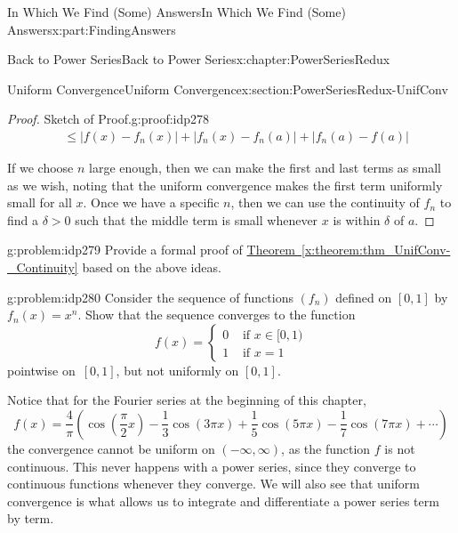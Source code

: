 \documentclass[oneside,10pt,]{book}
\newcommand{\xreffont}{\relax}
\numberwithin{equation}{section}
\newcommand{\amp}{&}
\begin{document}
\begin{partptx}{In Which We Find (Some) Answers}{}{In Which We Find (Some) Answers}{}{}{x:part:FindingAnswers}
\begin{chapterptx}{Back to Power Series}{}{Back to Power Series}{}{}{x:chapter:PowerSeriesRedux}
\begin{sectionptx}{Uniform Convergence}{}{Uniform Convergence}{}{}{x:section:PowerSeriesRedux-UnifConv}
\begin{proof}{Sketch of Proof.}{g:proof:idp278}
\begin{align*}
\amp \leq \left|f(x)-f_n(x)\right|+\left|f_n(x)-f_n(a)\right|+\left|f_n(a)-f(a)\right|
\end{align*}
%
\par
If we choose \(n\) large enough, then we can make the first and last terms as small as we wish, noting that the uniform convergence makes the first term uniformly small for all \(x\). Once we have a specific \(n\), then we can use the continuity of \(f_n\) to find a \(\delta>0\) such that the middle term is small whenever \(x\) is within \(\delta\) of \(a\).%
\end{proof}
\begin{problem}{}{g:problem:idp279}%
 Provide a formal proof of \hyperref[x:theorem:thm_UnifConv-_Continuity]{Theorem~{\xreffont\ref{x:theorem:thm_UnifConv-_Continuity}}} based on the above ideas.%
\end{problem}
\begin{problem}{}{g:problem:idp280}%
 Consider the sequence of functions \(\left(f_n\right)\) defined on \([0,1]\) by \(f_n(x)=x^n\). Show that the sequence converges to the function%
\begin{equation*}
f(x)= \begin{cases}0\amp \text{ if  } x\in[0,1)\\ 1\amp \text{ if } x=1 \end{cases}
\end{equation*}
pointwise on \(\,[0,1]\), but not uniformly on \([0,1]\).%
\end{problem}
Notice that for the Fourier series at the beginning of this chapter,%
\begin{equation*}
f(x)=\frac{4}{\pi}\left(\cos\left(\frac{\pi}{2}x\right)-\frac{1}{3}\cos\left( 3\pi x\right)+\frac{1}{5}\cos\left(5\pi x\right)-\frac{1}{7}\cos\left(7\pi x\right)+\cdots\right)
\end{equation*}
the convergence cannot be uniform on \((-\infty,\infty)\), as the function \(f\) is not continuous. This never happens with a power series, since they converge to continuous functions whenever they converge. We will also see that uniform convergence is what allows us to integrate and differentiate a power series term by term.%
\end{sectionptx}
%
%
\typeout{************************************************}

\end{chapterptx}
\end{partptx}
\end{document}
